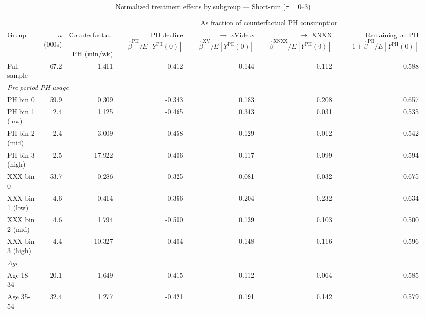\begin{landscape}
\begin{table}[htbp]
\centering
\caption{Normalized treatment effects by subgroup --- Short-run ($\tau = 0$--$3$)}
\label{tab:normalized_het_st}
\begin{tabular}{lrr rrrr}
\toprule
& & & \multicolumn{4}{c}{As fraction of counterfactual PH consumption} \\
\cmidrule(lr){4-7}
Group & $n$ (000s) & \shortstack{Counterfactual \\\\ PH (min/wk)} & \shortstack{PH decline \\\\ $\hat{\beta}^{\text{PH}}/E[Y^{\text{PH}}(0)]$} & \shortstack{$\to$ xVideos \\\\ $\hat{\beta}^{\text{XV}}/E[Y^{\text{PH}}(0)]$} & \shortstack{$\to$ XNXX \\\\ $\hat{\beta}^{\text{XNXX}}/E[Y^{\text{PH}}(0)]$} & \shortstack{Remaining on PH \\\\ $1 + \hat{\beta}^{\text{PH}}/E[Y^{\text{PH}}(0)]$}
\\ \midrule
Full sample & 67.2 & 1.411 & -0.412 & 0.144 & 0.112 & 0.588 \\
\midrule
\multicolumn{7}{l}{\textit{Pre-period PH usage}} \\
PH bin 0 & 59.9 & 0.309 & -0.343 & 0.183 & 0.208 & 0.657 \\
PH bin 1 (low) & 2.4 & 1.125 & -0.465 & 0.343 & 0.031 & 0.535 \\
PH bin 2 (mid) & 2.4 & 3.009 & -0.458 & 0.129 & 0.012 & 0.542 \\
PH bin 3 (high) & 2.5 & 17.922 & -0.406 & 0.117 & 0.099 & 0.594 \\
XXX bin 0 & 53.7 & 0.286 & -0.325 & 0.081 & 0.032 & 0.675 \\
XXX bin 1 (low) & 4.6 & 0.414 & -0.366 & 0.204 & 0.232 & 0.634 \\
XXX bin 2 (mid) & 4.6 & 1.794 & -0.500 & 0.139 & 0.103 & 0.500 \\
XXX bin 3 (high) & 4.4 & 10.327 & -0.404 & 0.148 & 0.116 & 0.596 \\
\midrule
\multicolumn{7}{l}{\textit{Age}} \\
Age 18-34 & 20.1 & 1.649 & -0.415 & 0.112 & 0.064 & 0.585 \\
Age 35-54 & 32.4 & 1.277 & -0.421 & 0.191 & 0.142 & 0.579 \\

\end{tabular}
\end{table}
\end{landscape}
